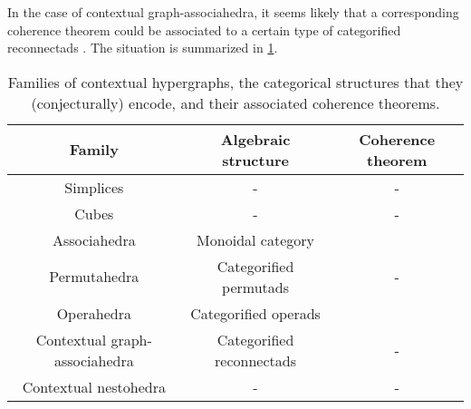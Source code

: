 In the case of contextual graph-associahedra, it seems likely that a corresponding coherence theorem could be associated to a certain type of categorified reconnectads \cite{DotsenkoKeilthyLyskov}.
The situation is summarized in \cref{table:contextual-hyper}.

\begin{table}[h!]
	\begin{center}
	\begin{tabular}{c|c|c}
	Family & Algebraic structure & Coherence theorem \\
	\hline
	Simplices & - & - \\
	Cubes & - & - \\
	Associahedra & Monoidal category & \cite{MacLane63} \\
	Permutahedra & Categorified permutads & - \\
	Operahedra & Categorified operads & \cite{DP15,CLA1} \\
	Contextual graph-associahedra & Categorified reconnectads & - \\
	Contextual nestohedra & - & - 
	\end{tabular}
	\end{center}
  \caption{Families of contextual hypergraphs, the categorical structures that they (conjecturally) encode, and their associated coherence theorems.}
  \label{table:contextual-hyper}
\end{table}






